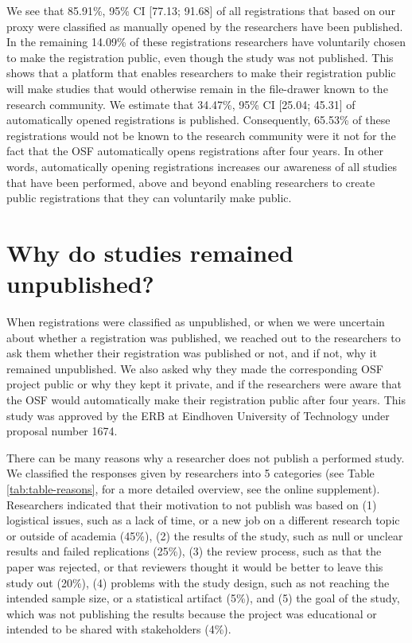 \documentclass[
  ,jou, a4paper,floatsintext]{apa6}
\begin{document}
We see that 85.91\%, 95\% CI {[}77.13; 91.68{]} of all registrations that based on our proxy were classified as manually opened by the researchers have been published. In the remaining 14.09\% of these registrations researchers have voluntarily chosen to make the registration public, even though the study was not published. This shows that a platform that enables researchers to make their registration public will make studies that would otherwise remain in the file-drawer known to the research community. We estimate that 34.47\%, 95\% CI {[}25.04; 45.31{]} of automatically opened registrations is published. Consequently, 65.53\% of these registrations would not be known to the research community were it not for the fact that the OSF automatically opens registrations after four years. In other words, automatically opening registrations increases our awareness of all studies that have been performed, above and beyond enabling researchers to create public registrations that they can voluntarily make public.

\hypertarget{why-do-studies-remained-unpublished}{%
\section{Why do studies remained unpublished?}\label{why-do-studies-remained-unpublished}}

When registrations were classified as unpublished, or when we were uncertain about whether a registration was published, we reached out to the researchers to ask them whether their registration was published or not, and if not, why it remained unpublished. We also asked why they made the corresponding OSF project public or why they kept it private, and if the researchers were aware that the OSF would automatically make their registration public after four years. This study was approved by the ERB at Eindhoven University of Technology under proposal number 1674.

There can be many reasons why a researcher does not publish a performed study. We classified the responses given by researchers into 5 categories (see Table \ref{tab:table-reasons}, for a more detailed overview, see the online supplement). Researchers indicated that their motivation to not publish was based on (1) logistical issues, such as a lack of time, or a new job on a different research topic or outside of academia (45\%), (2) the results of the study, such as null or unclear results and failed replications (25\%), (3) the review process, such as that the paper was rejected, or that reviewers thought it would be better to leave this study out (20\%), (4) problems with the study design, such as not reaching the intended sample size, or a statistical artifact (5\%), and (5) the goal of the study, which was not publishing the results because the project was educational or intended to be shared with stakeholders (4\%).
\end{document}
